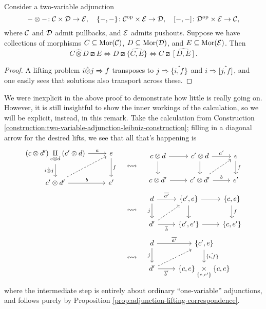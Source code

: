 \begin{proposition}\label{prop:two-variable-adjunction-lifting-correspondence}
	Consider a two-variable adjunction
	\[ -\otimes-\!: \mathcal{C}\times\mathcal{D}\to\mathcal{E},\quad \{-,-\}\!:\mathcal{C}^{\mathrm{op}}\times\mathcal{E}\to\mathcal{D},\quad [-,-]\!:\mathcal{D}^{\mathrm{op}}\times\mathcal{E}\to\mathcal{C}, \]
	where \(\mathcal{C}\) and \(\mathcal{D}\) admit pullbacks, and \(\mathcal{E}\) admits pushouts. Suppose we have collections of morphisms \(C\subseteq\operatorname{Mor}(\mathcal{C})\), \(D\subseteq\operatorname{Mor}(\mathcal{D})\), and
	\(E\subseteq\operatorname{Mor}(\mathcal{E})\). Then
	\[ C\hat\otimes D \boxslash E \iff D\boxslash \hat{\{C,E\}} \iff C \boxslash \hat{[D,E]}. \]
\end{proposition}
\begin{proof}
A lifting problem \(i\hat\otimes j \Rightarrow f\) transposes to \(j \Rightarrow \hat{\{i,f\}}\) and \(i \Rightarrow \hat{ [j,f] }\), and one easily sees that solutions also
transport across these.
\end{proof}
\begin{remark}
	We were inexplicit in the above proof to demonstrate how little is really going on. However, it is still insightful to show the inner workings of the calculation,
	so we will be explicit, instead, in this remark. Take the calculation from Construction \ref{construction:two-variable-adjunction-leibniz-construction};
	filling in a diagonal arrow for the desired lifts, we see that all that's happening is
	\begin{align*}
		\begin{tikzcd}[ampersand replacement=\&]
			(c\otimes d') \underset{c\otimes d}\amalg(c'\otimes d) \ar[d,"i\hat\otimes j"']\ar[r,"a"] \& e\ar[d,"f"] \\
			c'\otimes d'\ar[r,"b"]\ar[ur,dashed] \& e'
		\end{tikzcd} \quad &\leftrightsquigarrow \quad
		\begin{tikzcd}[ampersand replacement=\&]
			c\otimes d\ar[r]\ar[d] \& c'\otimes d \ar[d]\ar[r,"a'"] \& e\ar[d,"f"] \\
			c\otimes d'\ar[r] \& c'\otimes d'\ar[r,"b"] \ar[ur,dashed] \& e'
		\end{tikzcd} \\
		&\leftrightsquigarrow \quad
		\begin{tikzcd}[ampersand replacement=\&]
			d\ar[r,"\overline{a'}"]\ar[d,"j"'] \& \{c',e\} \ar[d]\ar[r] \& \{c,e\} \ar[d,"f"] \\
			d'\ar[r,"\overline{b}"']\ar[ur,dashed] \& \{c',e'\}\ar[r] \& \{c,e'\}
		\end{tikzcd} \\
		&\leftrightsquigarrow \quad
		\begin{tikzcd}[ampersand replacement=\&]
			d\ar[r,"\overline{a'}"]\ar[d,"j"'] \& \{c',e\} \ar[d,"\hat{ \{i,f\} }"] \\
			d'\ar[r,"\overline{b}'"']\ar[ur,dashed] \& \{c,e\}\underset{\{c,e'\}}\times \{c,e\}
		\end{tikzcd}
	\end{align*}
	where the intermediate step is entirely about ordinary ``one-variable'' adjunctions, and follows purely by Proposition \ref{prop:adjunction-lifting-correspondence}.
\end{remark}
